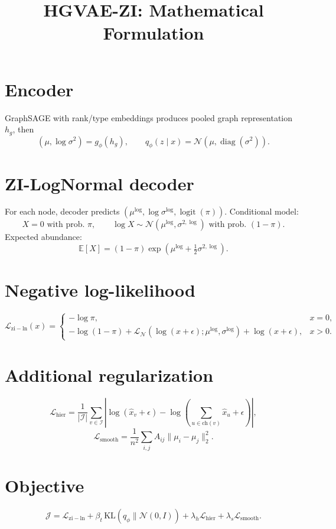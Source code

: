 \documentclass[11pt]{article}
\title{HGVAE-ZI: Mathematical Formulation}
\date{}
\begin{document}
\maketitle

\section{Encoder}
GraphSAGE with rank/type embeddings produces pooled graph representation $h_g$, then
\begin{equation}
(\mu,\log\sigma^2)=g_\phi(h_g),\qquad q_\phi(z\mid x)=\mathcal N(\mu,\operatorname{diag}(\sigma^2)).
\end{equation}

\section{ZI-LogNormal decoder}
For each node, decoder predicts $(\mu^{\log},\log\sigma^{\log},\operatorname{logit}(\pi))$.
Conditional model:
\begin{equation}
X=0 \text{ with prob. }\pi,\qquad \log X\sim\mathcal N(\mu^{\log},\sigma^{2,\log}) \text{ with prob. }(1-\pi).
\end{equation}
Expected abundance:
\begin{equation}
\mathbb E[X]=(1-\pi)\exp\!\left(\mu^{\log}+\tfrac12\sigma^{2,\log}\right).
\end{equation}

\section{Negative log-likelihood}
\begin{equation}
\mathcal L_{\mathrm{zi-ln}}(x)=
\begin{cases}
-\log\pi, & x=0,\\
-\log(1-\pi)+\mathcal L_{\mathcal N}(\log(x+\epsilon);\mu^{\log},\sigma^{\log})+\log(x+\epsilon), & x>0.
\end{cases}
\end{equation}

\section{Additional regularization}
\begin{equation}
\mathcal L_{\mathrm{hier}}=\frac1{|\mathcal I|}\sum_{v\in\mathcal I}\left|\log(\hat x_v+\epsilon)-\log\left(\sum_{u\in\mathrm{ch}(v)}\hat x_u+\epsilon\right)\right|,
\end{equation}
\begin{equation}
\mathcal L_{\mathrm{smooth}}=\frac{1}{n^2}\sum_{i,j}A_{ij}\|\mu_i-\mu_j\|_2^2.
\end{equation}

\section{Objective}
\begin{equation}
\mathcal J=\mathcal L_{\mathrm{zi-ln}}+\beta_t\,\mathrm{KL}(q_\phi\|\mathcal N(0,I))+\lambda_h\mathcal L_{\mathrm{hier}}+\lambda_s\mathcal L_{\mathrm{smooth}}.
\end{equation}
\end{document}
